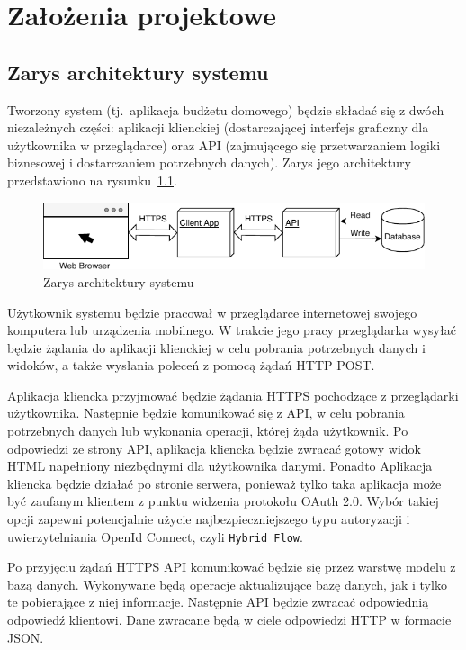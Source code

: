 \chapter{Założenia projektowe}
\label{chap:zalozenia-projektowe}
\section{Zarys architektury systemu}
\label{sec:zarys-arch}
Tworzony system (tj.\ aplikacja budżetu domowego) będzie składać się z dwóch niezależnych części: aplikacji klienckiej (dostarczającej interfejs graficzny dla użytkownika w przeglądarce) oraz API (zajmującego się przetwarzaniem logiki biznesowej i dostarczaniem potrzebnych danych). Zarys jego architektury przedstawiono na rysunku~\ref{fig:ogolna-arch}.
\begin{figure}[h]
	\centering
	\includegraphics[width=.9\linewidth]{rys03/zas.pdf}
	\caption{Zarys architektury systemu}
	\label{fig:ogolna-arch}
\end{figure}

Użytkownik systemu będzie pracował w przeglądarce internetowej swojego komputera lub urządzenia mobilnego. W trakcie jego pracy przeglądarka wysyłać będzie żądania do aplikacji klienckiej w celu pobrania potrzebnych danych i widoków, a także wysłania poleceń z pomocą żądań HTTP POST.

Aplikacja kliencka przyjmować będzie żądania HTTPS pochodzące z przeglądarki użytkownika. Następnie będzie komunikować się z API, w celu pobrania potrzebnych danych lub wykonania operacji, której żąda użytkownik. Po odpowiedzi ze strony API, aplikacja kliencka będzie zwracać gotowy widok HTML napełniony niezbędnymi dla użytkownika danymi. Ponadto Aplikacja kliencka będzie działać po stronie serwera, ponieważ tylko taka aplikacja może być zaufanym klientem z punktu widzenia protokołu OAuth 2.0. Wybór takiej opcji zapewni potencjalnie użycie najbezpieczniejszego typu autoryzacji i uwierzytelniania OpenId Connect, czyli \texttt{Hybrid Flow}. 

Po przyjęciu żądań HTTPS API komunikować będzie się przez warstwę modelu z bazą danych. Wykonywane będą operacje aktualizujące bazę danych, jak i tylko te pobierające z niej informacje. Następnie API będzie zwracać odpowiednią odpowiedź klientowi. Dane zwracane będą w ciele odpowiedzi HTTP w formacie JSON.

